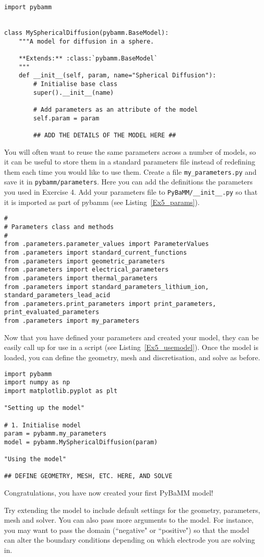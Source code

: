\documentclass[a4paper,11pt]{article}
\begin{document}
\begin{lstlisting}[label={Ex5_model},caption=Creating you new model.]
import pybamm


class MySphericalDiffusion(pybamm.BaseModel):
    """A model for diffusion in a sphere.

    **Extends:** :class:`pybamm.BaseModel`
    """
    def __init__(self, param, name="Spherical Diffusion"):
        # Initialise base class
        super().__init__(name)

        # Add parameters as an attribute of the model
        self.param = param

        ## ADD THE DETAILS OF THE MODEL HERE ##
\end{lstlisting}

You will often want to reuse the same parameters across a number of models, so it can be useful to store them in a standard parameters file instead of redefining them each time you would like to use them. Create a file \texttt{my\_parameters.py} and save it in \texttt{pybamm/parameters}. Here you can add the definitions the parameters you used in Exercise 4. Add your parameters file to \texttt{PyBaMM/\_\_init\_\_.py} so that it is imported as part of pybamm (see Listing~\ref{Ex5_params}).

\begin{lstlisting}[label={Ex5_params},caption=Adding your parameters to the init file., firstnumber=170]
#
# Parameters class and methods
#
from .parameters.parameter_values import ParameterValues
from .parameters import standard_current_functions
from .parameters import geometric_parameters
from .parameters import electrical_parameters
from .parameters import thermal_parameters
from .parameters import standard_parameters_lithium_ion, standard_parameters_lead_acid
from .parameters.print_parameters import print_parameters, print_evaluated_parameters
from .parameters import my_parameters
\end{lstlisting}

Now that you have defined your parameters and created your model, they can be easily call up for use in a script (see Listing~\ref{Ex5_usemodel}). Once the model is loaded, you can define the geometry, mesh and discretisation, and solve as before.

\begin{lstlisting}[label={Ex5_usemodel},caption=Using your model.]
import pybamm
import numpy as np
import matplotlib.pyplot as plt

"Setting up the model"

# 1. Initialise model
param = pybamm.my_parameters
model = pybamm.MySphericalDiffusion(param)

"Using the model"

## DEFINE GEOMETRY, MESH, ETC. HERE, AND SOLVE
\end{lstlisting}

Congratulations, you have now created your first PyBaMM model!

Try extending the model to include default settings for the geometry, parameters, mesh and solver. You can also pass more arguments to the model. For instance, you may want to pass the domain (``negative" or ``positive") so that the model can alter the boundary conditions depending on which electrode you are solving in.
\end{document}

